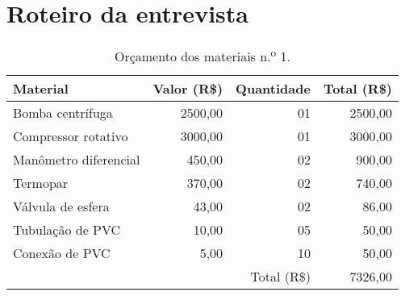 
\chapter{Roteiro da entrevista}\label{cap:apendiceb}

\begin{table}[htb]%
\caption{Orçamento dos materiais n.\textsuperscript{o} 1.}%
\label{tab:tab3}%
\begin{tabularx}{\textwidth}{@{\extracolsep{\fill}}lrrr}%
\toprule
Material              & \multicolumn{1}{c}{Valor (R\$)} & \multicolumn{1}{c}{Quantidade}  & \multicolumn{1}{c}{Total (R\$)} \\ \midrule
Bomba centrífuga      & 2500,00                         & 01                              & 2500,00                         \\
Compressor rotativo   & 3000,00                         & 01                              & 3000,00                         \\
Manômetro diferencial & 450,00                          & 02                              & 900,00                          \\
Termopar              & 370,00                          & 02                              & 740,00                          \\
Válvula de esfera     & 43,00                           & 02                              & 86,00                           \\
Tubulação de PVC      & 10,00                           & 05                              & 50,00                           \\
Conexão de PVC        & 5,00                            & 10                              & 50,00                           \\ \midrule
                      &                                 & \multicolumn{1}{r}{Total (R\$)} & 7326,00                         \\ \bottomrule
\end{tabularx}
\fonte{}%
\end{table}

